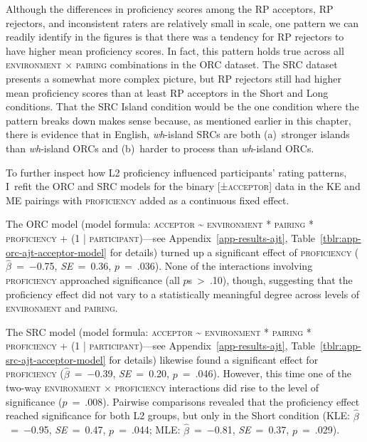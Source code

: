 \noindent Although the differences in proficiency scores among the RP acceptors, RP rejectors, and inconsistent raters are relatively small in scale, one pattern we can readily identify in the figures is that there was a tendency for RP rejectors to have higher mean proficiency scores. In fact, this pattern holds true across all \textsc{environment} × \textsc{pairing} combinations in the ORC dataset. The SRC dataset presents a somewhat more complex picture, but RP rejectors still had higher mean proficiency scores than at least RP acceptors in the Short and Long conditions. That the SRC Island condition would be the one condition where the pattern breaks down makes sense because, as mentioned earlier in this chapter, there is evidence that in English, \textit{wh}-island SRCs are both (a)~stronger islands than \textit{wh}-island ORCs and (b)~harder to process than \textit{wh}-island ORCs.

To further inspect how L2 proficiency influenced participants' rating patterns, I~refit the ORC and SRC models for the binary [\textsc{±acceptor}] data in the KE and ME pairings with \textsc{proficiency} added as a continuous fixed effect. 

The ORC model (model formula: \textsc{acceptor \~{} environment * pairing * proficiency + (1 | participant)}---see Appendix~\ref{app-results-ajt}, Table~\ref{tblr:app-orc-ajt-acceptor-model} for details) turned up a significant effect of \textsc{proficiency} ($\hat{\beta}$~=~−0.75, \textit{SE}~=~0.36, $p$~=~.036). None of the interactions involving \textsc{proficiency} approached significance (all $p$s~>~.10), though, suggesting that the proficiency effect did not vary to a statistically meaningful degree across levels of \textsc{environment} and \textsc{pairing}.

The SRC model (model formula: \textsc{acceptor \~{} environment * pairing * proficiency + (1 | participant)}---see Appendix~\ref{app-results-ajt}, Table~\ref{tblr:app-src-ajt-acceptor-model} for details) likewise found a significant effect for \textsc{proficiency} ($\hat{\beta}$~=~−0.39, \textit{SE}~=~0.20, $p$~=~.046). However, this time one of the two-way \textsc{environment} × \textsc{proficiency} interactions did rise to the level of significance ($p$~=~.008). Pairwise comparisons revealed that the proficiency effect reached significance for both L2 groups, but only in the Short condition (KLE: $\hat{\beta}$~=~−0.95, \textit{SE}~=~0.47, $p$~=~.044; MLE: $\hat{\beta}$~=~−0.81, \textit{SE}~=~0.37, $p$~=~.029).

